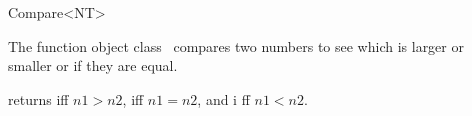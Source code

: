 \begin{ccRefFunctionObjectClass}{Compare<NT>}

\ccDefinition

The function object class \ccRefName\ compares two numbers to see which is 
larger or smaller or if they are equal.


\ccIsModel
{}


{returns  iff $n1>n2$,  iff $n1=n2$, and  i
ff $n1<n2$.}


\end{ccRefFunctionObjectClass}

